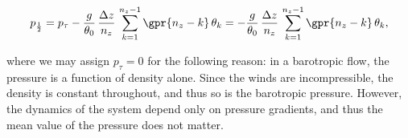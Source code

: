 \begin{equation}
	p_{\frac{1}{2}} = p_{\tau} - \frac{g}{\theta_0}\,\frac{\Delta z}{n_z}\,\sum_{k = 1}^{n_z - 1} \gpr{n_z - k}\,\theta_{k} = - \frac{g}{\theta_0}\,\frac{\Delta z}{n_z}\,\sum_{k = 1}^{n_z - 1} \gpr{n_z - k}\,\theta_{k},
	\label{eqn:p_1/2}
\end{equation}

where we may assign $p_{\tau} = 0$ for the following reason: in a barotropic flow, the pressure is a function  of density alone. Since the winds are incompressible, the density is constant throughout, and thus so is the barotropic pressure. However, the dynamics of the system depend only on pressure gradients, and thus the mean value of the pressure does not matter.
